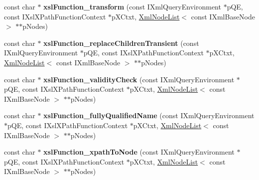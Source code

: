 \begin{DoxyCompactItemize}
\item 
\hypertarget{group__XSLModule-Functions_ga5686f41efe106ab663c420a842cd3a42}{const char $\ast$ {\bfseries xsl\-Function\-\_\-transform} (const \-I\-Xml\-Query\-Environment $\ast$p\-Q\-E, const \-I\-Xsl\-X\-Path\-Function\-Context $\ast$p\-X\-Ctxt, \hyperlink{classgeneral__server_1_1XmlNodeList}{\-Xml\-Node\-List}$<$ const \-I\-Xml\-Base\-Node $>$ $\ast$$\ast$p\-Nodes)}\label{group__XSLModule-Functions_ga5686f41efe106ab663c420a842cd3a42}

\item 
\hypertarget{group__XSLModule-Functions_ga487c83352982d590ab17ebfc8dfee68a}{const char $\ast$ {\bfseries xsl\-Function\-\_\-replace\-Children\-Transient} (const \-I\-Xml\-Query\-Environment $\ast$p\-Q\-E, const \-I\-Xsl\-X\-Path\-Function\-Context $\ast$p\-X\-Ctxt, \hyperlink{classgeneral__server_1_1XmlNodeList}{\-Xml\-Node\-List}$<$ const \-I\-Xml\-Base\-Node $>$ $\ast$$\ast$p\-Nodes)}\label{group__XSLModule-Functions_ga487c83352982d590ab17ebfc8dfee68a}

\item 
\hypertarget{group__XSLModule-Functions_ga2ab329bca4a2cd95499e13553f9bd152}{const char $\ast$ {\bfseries xsl\-Function\-\_\-validity\-Check} (const \-I\-Xml\-Query\-Environment $\ast$p\-Q\-E, const \-I\-Xsl\-X\-Path\-Function\-Context $\ast$p\-X\-Ctxt, \hyperlink{classgeneral__server_1_1XmlNodeList}{\-Xml\-Node\-List}$<$ const \-I\-Xml\-Base\-Node $>$ $\ast$$\ast$p\-Nodes)}\label{group__XSLModule-Functions_ga2ab329bca4a2cd95499e13553f9bd152}

\item 
\hypertarget{group__XSLModule-Functions_ga3cf5d513d5e1e0e31391fbb197934944}{const char $\ast$ {\bfseries xsl\-Function\-\_\-fully\-Qualified\-Name} (const \-I\-Xml\-Query\-Environment $\ast$p\-Q\-E, const \-I\-Xsl\-X\-Path\-Function\-Context $\ast$p\-X\-Ctxt, \hyperlink{classgeneral__server_1_1XmlNodeList}{\-Xml\-Node\-List}$<$ const \-I\-Xml\-Base\-Node $>$ $\ast$$\ast$p\-Nodes)}\label{group__XSLModule-Functions_ga3cf5d513d5e1e0e31391fbb197934944}

\item 
\hypertarget{group__XSLModule-Functions_ga1946b08e504e5adf6a47800e1aae343c}{const char $\ast$ {\bfseries xsl\-Function\-\_\-xpath\-To\-Node} (const \-I\-Xml\-Query\-Environment $\ast$p\-Q\-E, const \-I\-Xsl\-X\-Path\-Function\-Context $\ast$p\-X\-Ctxt, \hyperlink{classgeneral__server_1_1XmlNodeList}{\-Xml\-Node\-List}$<$ const \-I\-Xml\-Base\-Node $>$ $\ast$$\ast$p\-Nodes)}\label{group__XSLModule-Functions_ga1946b08e504e5adf6a47800e1aae343c}


\end{DoxyCompactItemize}
